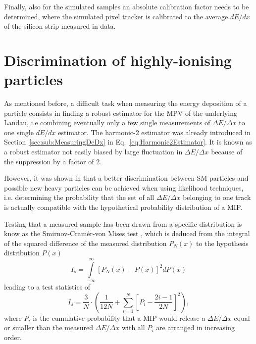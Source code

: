 Finally, also for the simulated samples an absolute calibration factor needs to be determined, where the simulated pixel tracker is  calibrated to the average $dE/dx$ of the silicon strip measured in data.

\section{Discrimination of highly-ionising particles}

As mentioned before, a difficult task when measuring the energy deposition of a particle consists in finding a robust estimator for the MPV of the underlying Landau, i.e combining eventually only a few single measurements of $\Delta E/ \Delta x$ to one single $dE/dx$ estimator.
The harmonic-2 estimator \ihtwo was already introduced in Section~\ref{sec:sub:MeasuringDeDx} in Eq.~\ref{eq:Harmonic2Estimator}.
It is known as a robust estimator not easily biased by large fluctuation in $\Delta E/ \Delta x$ because of the suppression by a factor of 2.

However, it was shown in \cite{bib:Quertenmont_2010} that a better discrimination between SM particles and possible new heavy particles can be achieved when using likelihood techniques,
i.e. determining the probability that the set of all $\Delta E/ \Delta x$ belonging to one track is actually compatible with the hypothetical probability distribution of a MIP.

Testing that a measured sample has been drawn from a specific distribution is know as the Smirnov-Cram\'{e}r-von Mises test \cite{bib:Anderson:CramerVonMises_1962,bib:James:StaticticalMethods_2006},
which is deduced from the integral of the squared difference of the measured distribution $P_N(x)$ to the hypothesis distribution $P(x)$
\begin{equation*}
I_s = \int\limits_{-\infty}^{\infty} \left[P_{N}(x)-P(x)\right]^2 dP(x)
\end{equation*}
leading to a test statistics of
\begin{equation*}
I_s = \frac{3}{N} \cdot \left( \frac{1}{12N} + \sum\limits_{i=1}^N \left[ P_i - \frac{2i-1}{2N} \right]^2 \right),
\end{equation*}
where $P_i$ is the cumulative probability that a MIP would release a $\Delta E/\Delta x$ equal or smaller than the measured $\Delta E/ \Delta x$ with all $P_i$ are arranged in increasing order.

